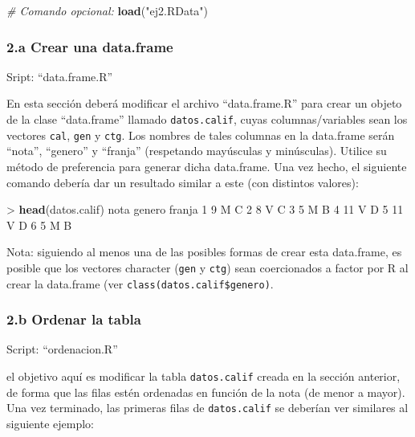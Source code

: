 \documentclass[]{article}
\newenvironment{Shaded}{}{}
\newcommand{\KeywordTok}[1]{\textcolor[rgb]{0.00,0.44,0.13}{\textbf{{#1}}}}
\newcommand{\DecValTok}[1]{\textcolor[rgb]{0.25,0.63,0.44}{{#1}}}
\newcommand{\StringTok}[1]{\textcolor[rgb]{0.25,0.44,0.63}{{#1}}}
\newcommand{\CommentTok}[1]{\textcolor[rgb]{0.38,0.63,0.69}{\textit{{#1}}}}
\newcommand{\NormalTok}[1]{{#1}}
\begin{document}
\begin{Shaded}
\begin{Highlighting}[]
\CommentTok{# Comando opcional:}
\KeywordTok{load}\NormalTok{(}\StringTok{"ej2.RData"}\NormalTok{)}
\end{Highlighting}
\end{Shaded}
\subsubsection{2.a Crear una data.frame}

Sript: ``data.frame.R''

En esta sección deberá modificar el archivo ``data.frame.R'' para crear
un objeto de la clase ``data.frame'' llamado \texttt{datos.calif}, cuyas
columnas/variables sean los vectores \texttt{cal}, \texttt{gen} y
\texttt{ctg}. Los nombres de tales columnas en la data.frame serán
``nota'', ``genero'' y ``franja'' (respetando mayúsculas y minúsculas).
Utilice su método de preferencia para generar dicha data.frame. Una vez
hecho, el siguiente comando debería dar un resultado similar a este (con
distintos valores):

\begin{Shaded}
\begin{Highlighting}[]
\NormalTok{> }\KeywordTok{head}\NormalTok{(datos.calif)}
  \NormalTok{nota genero franja}
\DecValTok{1}    \DecValTok{9}      \NormalTok{M      C}
\DecValTok{2}    \DecValTok{8}      \NormalTok{V      C}
\DecValTok{3}    \DecValTok{5}      \NormalTok{M      B}
\DecValTok{4}   \DecValTok{11}      \NormalTok{V      D}
\DecValTok{5}   \DecValTok{11}      \NormalTok{V      D}
\DecValTok{6}    \DecValTok{5}      \NormalTok{M      B}
\end{Highlighting}
\end{Shaded}
Nota: siguiendo al menos una de las posibles formas de crear esta
data.frame, es posible que los vectores character (\texttt{gen} y
\texttt{ctg}) sean coercionados a factor por R al crear la data.frame
(ver \texttt{class(datos.calif\$genero)}.

\subsubsection{2.b Ordenar la tabla}

Script: ``ordenacion.R''

el objetivo aquí es modificar la tabla \texttt{datos.calif} creada en la
sección anterior, de forma que las filas estén ordenadas en función de
la nota (de menor a mayor). Una vez terminado, las primeras filas de
\texttt{datos.calif} se deberían ver similares al siguiente ejemplo:
\end{document}
